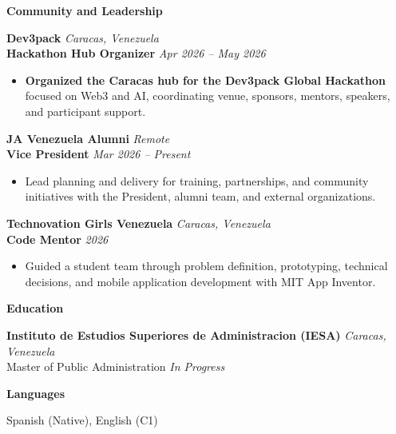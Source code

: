 \documentclass[11pt]{article}
\begin{document}
\vspace{8pt}
\begin{center}
    \textbf{Community and Leadership}
\end{center}
\vspace{-4pt}

\textbf{Dev3pack} \hfill \textit{Caracas, Venezuela} \\
\textbf{Hackathon Hub Organizer} \hfill \textit{Apr 2026 -- May 2026}
\begin{itemize}
    \item \textbf{Organized the Caracas hub for the Dev3pack Global Hackathon} focused on Web3 and AI, coordinating venue, sponsors, mentors, speakers, and participant support.
\end{itemize}

\vspace{6pt}
\textbf{JA Venezuela Alumni} \hfill \textit{Remote} \\
\textbf{Vice President} \hfill \textit{Mar 2026 -- Present}
\begin{itemize}
    \item Lead planning and delivery for training, partnerships, and community initiatives with the President, alumni team, and external organizations.
\end{itemize}

\vspace{6pt}
\textbf{Technovation Girls Venezuela} \hfill \textit{Caracas, Venezuela} \\
\textbf{Code Mentor} \hfill \textit{2026}
\begin{itemize}
    \item Guided a student team through problem definition, prototyping, technical decisions, and mobile application development with MIT App Inventor.
\end{itemize}

\vspace{8pt}
\begin{center}
    \textbf{Education}
\end{center}
\vspace{-4pt}
\textbf{Instituto de Estudios Superiores de Administracion (IESA)} \hfill \textit{Caracas, Venezuela} \\
Master of Public Administration \hfill \textit{In Progress}

\vspace{8pt}
\begin{center}
    \textbf{Languages}
\end{center}
\vspace{-4pt}
Spanish (Native), English (C1)
\end{document}

